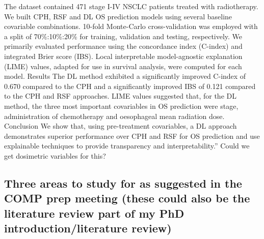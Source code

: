 \documentclass{article}%
\begin{document}
%
The dataset contained 471 stage I{-}IV NSCLC patients treated with radiotherapy. We built CPH, RSF and DL OS prediction models using several baseline covariable combinations. 10{-}fold Monte{-}Carlo cross{-}validation was employed with a split of 70\%:10\%:20\% for training, validation and testing, respectively. We primarily evaluated performance using the concordance index (C{-}index) and integrated Brier score (IBS). Local interpretable model{-}agnostic explanation (LIME) values, adapted for use in survival analysis, were computed for each model.%
\newline%
\newline%
%
Results%
\newline%
\newline%
%
The DL method exhibited a significantly improved C{-}index of 0.670 compared to the CPH and a significantly improved IBS of 0.121 compared to the CPH and RSF approaches. LIME values suggested that, for the DL method, the three most important covariables in OS prediction were stage, administration of chemotherapy and oesophageal mean radiation dose.%
\newline%
\newline%
%
Conclusion%
\newline%
\newline%
%
We show that, using pre{-}treatment covariables, a DL approach demonstrates superior performance over CPH and RSF for OS prediction and use explainable techniques to provide transparency and interpretability.”%
\newline%
\newline%
%
Could we get dosimetric variables for this? %
\newline%
\newline%
%
%
\newline%
\newline%
%
\subsection{Three areas to study for as suggested in the COMP prep meeting (these could also be the literature review part of my PhD introduction/literature review) }%
\label{subsec:ThreeareastostudyforassuggestedintheCOMPprepmeeting(thesecouldalsobetheliteraturereviewpartofmyPhDintroduction/literaturereview)}%
\end{document}
